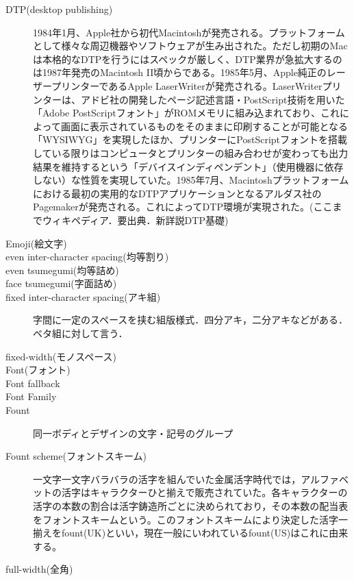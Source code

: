 \begin{description}
    \item[DTP(desktop publishing)]1984年1月、Apple社から初代Macintoshが発売される。プラットフォームとして様々な周辺機器やソフトウェアが生み出された。ただし初期のMacは本格的なDTPを行うにはスペックが厳しく、DTP業界が急拡大するのは1987年発売のMacintosh II頃からである。1985年5月、Apple純正のレーザープリンターであるApple LaserWriterが発売される。LaserWriterプリンターは、アドビ社の開発したページ記述言語・PostScript技術を用いた「Adobe PostScriptフォント」がROMメモリに組み込まれており、これによって画面に表示されているものをそのままに印刷することが可能となる「WYSIWYG」を実現したほか、プリンターにPostScriptフォントを搭載している限りはコンピュータとプリンターの組み合わせが変わっても出力結果を維持するという「デバイスインディペンデント」（使用機器に依存しない）な性質を実現していた。1985年7月、Macintoshプラットフォームにおける最初の実用的なDTPアプリケーションとなるアルダス社のPagemakerが発売される。これによってDTP環境が実現された。(ここまでウィキペディア．要出典．新詳説DTP基礎)
    \item[Emoji(絵文字)]
    \item[even inter-character spacing(均等割り)]
    \item[even tsumegumi(均等詰め)]
    \item[face tsumegumi(字面詰め)]
    \item[fixed inter-character spacing(アキ組)]字間に一定のスペースを挟む組版様式．四分アキ，二分アキなどがある．ベタ組に対して言う\cite{www.jpp.co.jp:yougo/a1.html}．
    \item[fixed-width(モノスペース)]
    \item[Font(フォント)]
    \item[Font fallback]
    \item[Font Family]
    \item[Fount]同一ボディとデザインの文字・記号のグループ\cite{www.f.waseda.jp/yukis/hpb/hpb2006.1.html}
\item[Fount scheme(フォントスキーム)]一文字一文字バラバラの活字を組んでいた金属活字時代では，アルファベットの活字はキャラクターひと揃えで販売されていた。各キャラクターの活字の本数の割合は活字鋳造所ごとに決められており，その本数の配当表をフォントスキームという。このフォントスキームにより決定した活字一揃えをfount(UK)といい，現在一般にいわれているfount(US)はこれに由来する\cite{handbook_of_typography}。
    \item[full-width(全角)]

\end{description}
